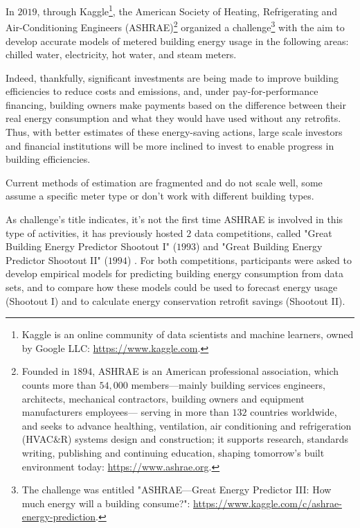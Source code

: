 \documentclass[twocolumn, switch]{article}
\begin{document}
In $2019$, through Kaggle\footnote{Kaggle is an online community of data scientists and machine learners, owned by Google LLC: \url{https://www.kaggle.com}.}, the American Society of Heating, Refrigerating and Air-Conditioning Engineers (ASHRAE)\footnote{Founded in $1894$, ASHRAE is an American professional association, which counts more than $54,000$ members---mainly building services engineers, architects, mechanical contractors, building owners and equipment manufacturers employees--- serving in more than $132$ countries worldwide, and seeks to advance healthing, ventilation, air conditioning and refrigeration (HVAC\&R) systems design and construction; it supports research, standards writing, publishing and continuing education, shaping tomorrow’s built environment today: \url{https://www.ashrae.org}.} organized a challenge\footnote{The challenge was entitled "ASHRAE---Great Energy Predictor III: How much energy will a building consume?": \url{https://www.kaggle.com/c/ashrae-energy-prediction}.} with the aim to develop accurate models of metered building energy usage in the following areas: chilled water, electricity, hot water, and steam meters.

Indeed, thankfully, significant investments are being made to improve building efficiencies to reduce costs and emissions, and, under pay-for-performance financing, building owners make payments based on the difference between their real energy consumption and what they would have used without any retrofits. Thus, with better estimates of these energy-saving actions, large scale investors and financial institutions will be more inclined to invest to enable progress in building efficiencies.

Current methods of estimation are fragmented and do not scale well, some assume a specific meter type or don’t work with different building types.

As challenge's title indicates, it's not the first time ASHRAE is involved in this type of activities, it has previously hosted $2$ data competitions, called "Great Building Energy Predictor Shootout I" ($1993$) \cite{Kreider_1994} and "Great Building Energy Predictor Shootout II" ($1994$) \cite{Haberl_1998}. For both competitions, participants were asked to develop empirical models for predicting building energy consumption from data sets, and to compare how these models could be used to forecast energy usage (Shootout I) and to calculate energy conservation retrofit savings (Shootout II).
\end{document}
